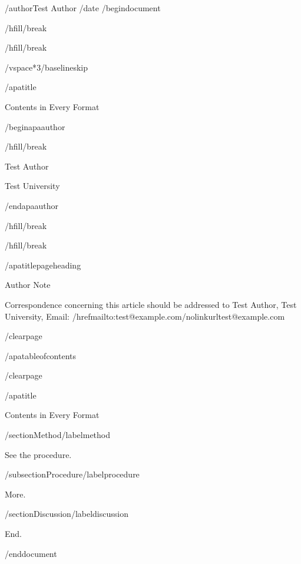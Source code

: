 /author{Test Author}
/date{}
/begin{document}


/hfill/break

/hfill/break

/vspace*{3/baselineskip}

/apatitle{

Contents in Every Format

}

/begin{apaauthor}

/hfill/break

Test Author

Test University

/end{apaauthor}

/hfill/break

/hfill/break

/apatitlepageheading{

Author Note

}

Correspondence concerning this article should be addressed to Test
Author, Test University, Email:
/href{mailto:test@example.com}{/nolinkurl{test@example.com}}

/clearpage

/apatableofcontents

/clearpage

/apatitle{

Contents in Every Format

}

/section{Method}/label{method}

See the procedure.

/subsection{Procedure}/label{procedure}

More.

/section{Discussion}/label{discussion}

End.




/end{document}

